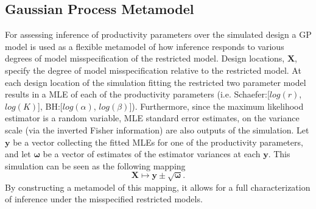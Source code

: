 \documentclass[12pt]{article}
\begin{document}
%  
%
%




%
\subsection{Gaussian Process Metamodel}
%

%
For assessing inference of productivity parameters over the simulated design %
a GP model is used as a flexible metamodel of how inference responds to various 
degrees of model misspecification of the restricted model. 
%
Design locations, $\bm{X}$, specify the degree of model misspecification relative 
to the restricted model.
%
At each design location of the simulation fitting the restricted two parameter 
model results in a MLE of each of the productivity parameters 
(i.e. Schaefer:[$log(r)$, $log(K)$], BH:[$log(\alpha)$, $log(\beta)$]).
%
Furthermore, since the maximum likelihood estimator is a random variable, 
MLE standard error estimates, on the variance scale (via the inverted Fisher 
information) are also outputs of the simulation.
%
Let $\textbf{y}$ be a vector collecting the fitted MLEs for one of the 
productivity parameters, and let $\bm{\omega}$ be a vector of estimates of the 
estimator variances at each $\textbf{y}$. 
%
This simulation can be seen as the following mapping
\begin{equation}
\bm{X} \mapsto \textbf{y} \pm \sqrt{\bm{\omega}}.
\end{equation}
By constructing a metamodel of this mapping, it allows for a full
characterization of inference under the misspecified restricted models.
\end{document}

